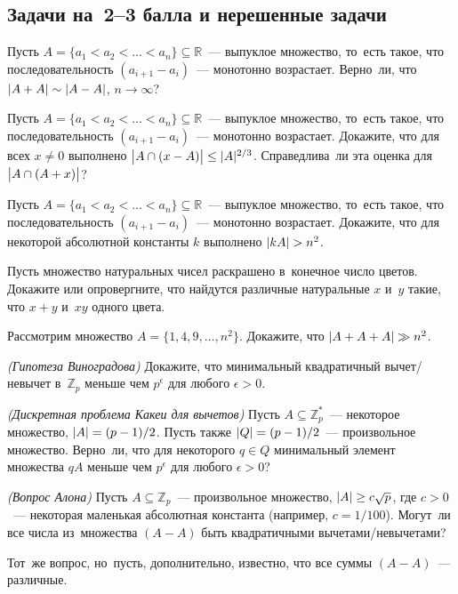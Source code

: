 \subsection*{Задачи на~2--3 балла и нерешенные задачи}
\resetproblem

\begin{problems}

\item
Пусть $A = \{ a_1 < a_2 < \ldots < a_n \} \subseteq \mathbb{R}$~---
выпуклое множество, то~есть такое, что последовательность
$(a_{i+1} - a_i)$~--- монотонно возрастает.
Верно~ли, что $\lvert A + A \rvert \sim \lvert A - A \rvert$, $n \to \infty$?

\item
Пусть $A = \{ a_1 < a_2 < \ldots < a_n \} \subseteq \mathbb{R}$~---
выпуклое множество, то~есть такое, что последовательность
$(a_{i+1} - a_i)$~--- монотонно возрастает.
Докажите, что для всех $x \neq 0$ выполнено
\(
    \bigl\lvert A \cap (x - A) \bigr\rvert
\leq
    \lvert A \rvert^{2/3}
\).
Справедлива~ли эта оценка для $\bigl\lvert A \cap (A + x) \bigr\rvert$?

\item
Пусть $A = \{ a_1 < a_2 < \ldots < a_n \} \subseteq \mathbb{R}$~--- выпуклое
множество, то~есть такое, что последовательность $(a_{i+1} - a_i)$~---
монотонно возрастает.
Докажите, что для некоторой абсолютной константы $k$ выполнено
$\lvert k A \rvert > n^2$.

\itemx{*}
Пусть множество натуральных чисел раскрашено в~конечное число цветов.
Докажите или опровергните, что найдутся различные натуральные $x$ и~$y$ такие,
что $x + y$ и~$x y$ одного цвета.

\item
Рассмотрим множество $A = \{ 1, 4, 9, \ldots, n^2 \}$.
Докажите, что $\lvert A + A + A \rvert \gg n^2$.

\itemx{*}\emph{(Гипотеза Виноградова)}\enspace
Докажите, что минимальный квадратичный вычет/\linebreak[0]невычет
в~$\mathbb{Z}_p$ меньше чем $p^{\epsilon}$ для любого $\epsilon > 0$.

\itemx{*}\emph{(Дискретная проблема Какеи для вычетов)}\enspace
Пусть $A \subseteq \mathbb{Z}^*_p$~--- некоторое множество,
$\lvert A \rvert = (p - 1) / 2$.
Пусть также $\lvert Q \rvert = (p - 1) / 2$~--- произвольное множество.
Верно~ли, что для некоторого $q \in Q$ минимальный элемент множества $q A$
меньше чем $p^{\epsilon}$ для любого $\epsilon > 0$?

\itemx{*}\emph{(Вопрос Алона)}\enspace
Пусть $A \subseteq \mathbb{Z}_p$~--- произвольное множество,
$\lvert A \rvert \geq c \sqrt{p}$, где $c > 0$~--- некоторая маленькая абсолютная
константа (например, $c = 1 / 100$).
Могут~ли все числа из~множества $(A - A)$ быть квадратичными
вычетами/невычетами?
\par
Тот~же вопрос, но~пусть, дополнительно, известно, что все суммы $(A - A)$~---
различные.


\end{problems}
